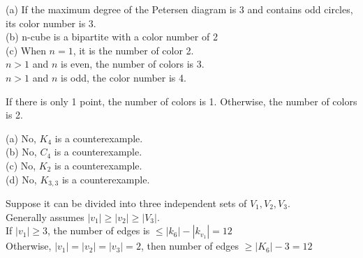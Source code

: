 \documentclass[a4paper, justified]{tufte-handout}
\begin{document}
\begin{problem}[CZ 10.2]
\end{problem}

\begin{solution}
  (a)
  If the maximum degree of the Petersen diagram is 3 and contains odd circles, its color number is 3.\\
  (b)
  n-cube is a bipartite with a color number of 2\\
  (c)
  When $n=1$, it is the number of color 2.\\
  $n > 1$ and $n$ is even, the number of colors is 3.\\
  $n > 1$ and $n$ is odd, the color number is 4.
\end{solution}

\begin{problem}[CZ 10.3]
\end{problem}

\begin{solution}
  If there is only 1 point, the number of colors is 1. Otherwise, the number of colors is 2.\\
\end{solution}

\begin{problem}[CZ 10.4]
\end{problem}

\begin{solution}
  (a)
  No, $K_4$ is a counterexample. \\
  (b)
  No, $C_4$ is a counterexample. \\
  (c)
  No, $K_2$ is a counterexample. \\
  (d)
  No, $K_{3,3}$ is a counterexample.
\end{solution}

\begin{problem}[CZ 10.5]
\end{problem}

\begin{solution}
  Suppose it can be divided into three independent sets of $ V_1, V_2, V_3 $. \\
  Generally assumes $ | v_1 | \geq | v_2 | \geq | V_3 | $. \\
  If $ | v_1 | \geq 3 $, the number of edges is $ \leq | k_6 |-| k_ {v_1} | = 12 $ \\
  Otherwise, $ | v_1 | = | v_2 | = | v_3 | = 2 $, then number of edges $ \geq | K_6 | -3 = 12 $
\end{solution}
\beginot
\end{document}
